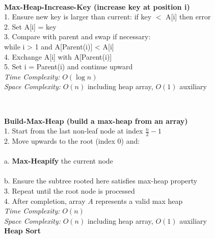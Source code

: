 {\begin{minipage}[t]{1\linewidth}
\begin{minipage}[t]{0.32\textwidth}
    \end{minipage}\\
    \begin{minipage}[t]{0.67\textwidth}
          \textbf{ Max-Heap-Increase-Key (increase key at position i)}\\
          1. Ensure new key is larger than current: if key $<$ A[i] then error\\
          2. Set A[i] = key\\
          3. Compare with parent and swap if necessary: \\ while i > 1 and A[Parent(i)] < A[i]\\
          4. Exchange A[i] with A[Parent(i)]\\
          5. Set i = Parent(i) and continue upward\\
          \textit{Time Complexity:} \(O(\log n)\) \\ \textit{Space Complexity:} \(O(n)\) including heap array, \(O(1)\) auxiliary
    \end{minipage}
    \begin{minipage}[t]{0.32\textwidth}
      \vspace*{-16px}
      \vspace*{-15px}
    \end{minipage}\\
   \begin{minipage}[t]{0.67\textwidth}
          \noindent \textbf{ Build-Max-Heap (build a max-heap from an array)}\\
          1. Start from the last non-leaf node at index \(\frac{n}{2} - 1\)\\
          2. Move upwards to the root (index \(0\)) and:\\
          \\ a. \textbf{Max-Heapify} the current node\\
          \\ b. Ensure the subtree rooted here satisfies max-heap property\\
          3. Repeat until the root node is processed\\
          4. After completion, array \(A\) represents a valid max heap\\
          \textit{Time Complexity:} \(O(n)\) \\ \textit{Space Complexity:} \(O(n)\) including heap array, \(O(1)\) auxiliary\\
          \textbf{ Heap Sort}\\

\end{minipage}
\end{minipage}}
